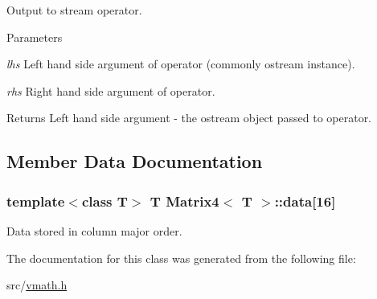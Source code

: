 Output to stream operator. 


\begin{DoxyParams}{Parameters}
\item[{\em lhs}]Left hand side argument of operator (commonly ostream instance). \item[{\em rhs}]Right hand side argument of operator. \end{DoxyParams}
\begin{DoxyReturn}{Returns}
Left hand side argument -\/ the ostream object passed to operator. 
\end{DoxyReturn}


\subsection{Member Data Documentation}
\hypertarget{class_matrix4_a8941190ba31803101cdfd94ff89f2a66}{
\subsubsection[{data}]{\setlength{\rightskip}{0pt plus 5cm}template$<$class T$>$ T {\bf Matrix4}$<$ T $>$::{\bf data}\mbox{[}16\mbox{]}}}
\label{class_matrix4_a8941190ba31803101cdfd94ff89f2a66}


Data stored in column major order. 



The documentation for this class was generated from the following file:\begin{DoxyCompactItemize}
\item 
src/\hyperlink{vmath_8h}{vmath.h}\end{DoxyCompactItemize}
